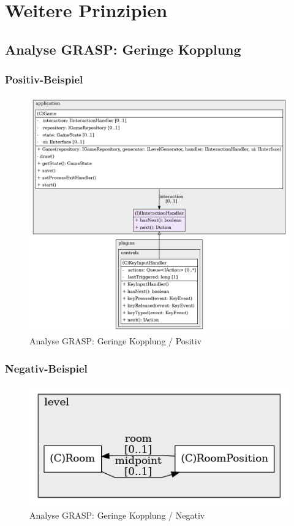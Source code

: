 \chapter{Weitere Prinzipien}

\section{Analyse GRASP: Geringe Kopplung}
\subsection*{Positiv-Beispiel}
\vspace{0.5cm}
\begin{figure}[H]
    \centering
    \includegraphics[width=1\linewidth]{Bilder/Visualisierung/IInteractionHandler_structure.png}
    \caption{Analyse GRASP: Geringe Kopplung / Positiv}
\end{figure}

\subsection*{Negativ-Beispiel}
\vspace{0.5cm}
\begin{figure}[H]
    \centering
    \includegraphics[width=1\linewidth]{Bilder/Visualisierung/RoomPositionNoInterface_structure.png}
    \caption{Analyse GRASP: Geringe Kopplung / Negativ}
\end{figure}

